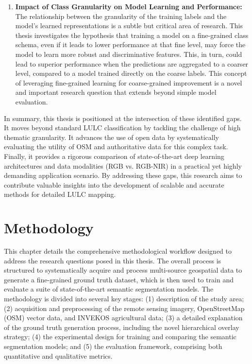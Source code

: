 \documentclass{report}
\begin{document}
\begin{enumerate}
\item \textbf{Impact of Class Granularity on Model Learning and Performance:} The relationship between the granularity of the training labels and the model's learned representations is a subtle but critical area of research. This thesis investigates the hypothesis that training a model on a fine-grained class schema, even if it leads to lower performance at that fine level, may force the model to learn more robust and discriminative features. This, in turn, could lead to superior performance when the predictions are aggregated to a coarser level, compared to a model trained directly on the coarse labels. This concept of leveraging fine-grained learning for coarse-grained improvement is a novel and important research question that extends beyond simple model evaluation.

\end{enumerate}
In summary, this thesis is positioned at the intersection of these identified gaps. It moves beyond standard LULC classification by tackling the challenge of high thematic granularity. It advances the use of open data by systematically evaluating the utility of OSM and authoritative data for this complex task. Finally, it provides a rigorous comparison of state-of-the-art deep learning architectures and data modalities (RGB vs. RGB-NIR) in a practical yet highly demanding application scenario. By addressing these gaps, this research aims to contribute valuable insights into the development of scalable and accurate methods for detailed LULC mapping.

\clearpage %
\section{Methodology} \label{Methodology}
This chapter details the comprehensive methodological workflow designed to address the research questions posed in this thesis. The overall process is structured to systematically acquire and process multi-source geospatial data to generate a fine-grained ground truth dataset, which is then used to train and evaluate a suite of state-of-the-art semantic segmentation models. The methodology is divided into several key stages: (1) description of the study area; (2) acquisition and preprocessing of the remote sensing imagery, OpenStreetMap (OSM) vector data, and INVEKOS agricultural data; (3) a detailed explanation of the ground truth generation process, including the novel hierarchical overlay strategy; (4) the experimental design for training and comparing the semantic segmentation models; and (5) the evaluation framework, comprising both quantitative and qualitative metrics.
\end{document}
